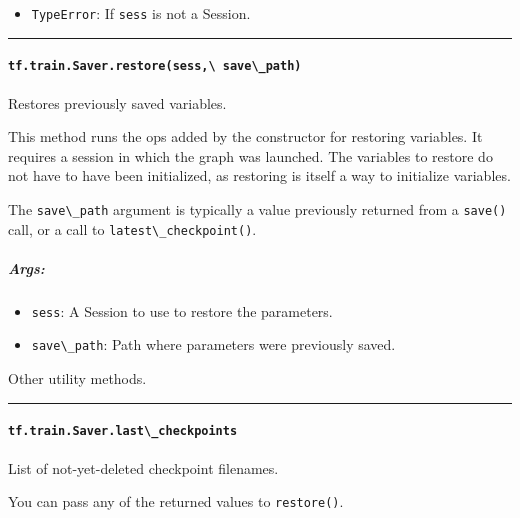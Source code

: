 \begin{itemize}
\tightlist
\item
  \lstinline{TypeError}: If \lstinline{sess} is not a Session.
\end{itemize}

\begin{center}\rule{0.5\linewidth}{\linethickness}\end{center}

\paragraph{\texorpdfstring{\lstinline{tf.train.Saver.restore(sess,\ save\_path)}
}{tf.train.Saver.restore(sess, save\_path) }}\label{tf.train.saver.restoresess-saveux5fpath}

Restores previously saved variables.

This method runs the ops added by the constructor for restoring
variables. It requires a session in which the graph was launched. The
variables to restore do not have to have been initialized, as restoring
is itself a way to initialize variables.

The \lstinline{save\_path} argument is typically a value previously
returned from a \lstinline{save()} call, or a call to
\lstinline{latest\_checkpoint()}.

\subparagraph{Args: }\label{args-11}

\begin{itemize}
\tightlist
\item
  \lstinline{sess}: A Session to use to restore the parameters.
\item
  \lstinline{save\_path}: Path where parameters were previously saved.
\end{itemize}

Other utility methods.

\begin{center}\rule{0.5\linewidth}{\linethickness}\end{center}

\paragraph{\texorpdfstring{\lstinline{tf.train.Saver.last\_checkpoints}
}{tf.train.Saver.last\_checkpoints }}\label{tf.train.saver.lastux5fcheckpoints}

List of not-yet-deleted checkpoint filenames.

You can pass any of the returned values to \lstinline{restore()}.

